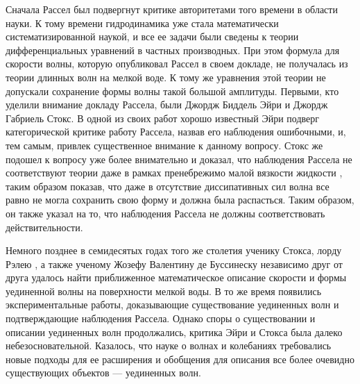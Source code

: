 Сначала Рассел был подвергнут критике авторитетами того времени в области науки. К тому времени гидродинамика уже стала математически систематизированной наукой, и все ее задачи были сведены к теории дифференциальных уравнений в частных производных. При этом формула для скорости волны, которую опубликовал Рассел в своем докладе, не получалась из теории длинных волн на мелкой воде. К тому же уравнения этой теории не допускали сохранение формы волны такой большой амплитуды. Первыми, кто уделили внимание докладу Рассела, были Джордж Биддель Эйри и Джордж Габриель Стокс. В одной из своих работ \cite{intro_airy} хорошо известный Эйри подверг категорической критике работу Рассела, назвав его наблюдения ошибочными, и, тем самым, привлек существенное внимание к данному вопросу. Стокс же подошел к вопросу уже более внимательно и доказал, что наблюдения Рассела не соответствуют теории даже в рамках пренебрежимо малой вязкости жидкости \cite{stokes1880theory}, таким образом показав, что даже в отсутствие диссипативных сил волна все равно не могла сохранить свою форму и должна была распасться. Таким образом, он также указал на то, что наблюдения Рассела не должны соответствовать действительности.

Немного позднее в семидесятых годах того же столетия ученику Стокса, лорду Рэлею \cite{rayleigh1876waves}, а также ученому Жозефу Валентину де Буссинеску \cite{boussinesq1871theorie} независимо друг от друга удалось найти приближенное математическое описание скорости и формы уединенной волны на поверхности мелкой воды. В то же время появились экспериментальные работы, доказывающие существование уединенных волн и подтверждающие наблюдения Рассела. Однако споры о существовании и описании уединенных волн продолжались, критика Эйри и Стокса была далеко небезосновательной. Казалось, что науке о волнах и колебаниях требовались новые подходы для ее расширения и обобщения для описания все более очевидно существующих объектов --- уединенных волн.

